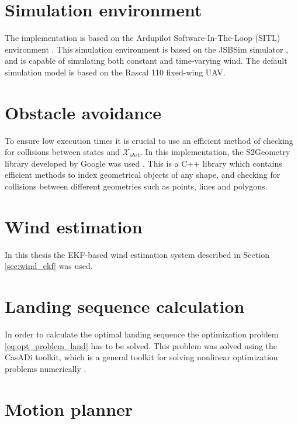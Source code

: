 \section{Simulation environment}
The implementation is based on the Ardupilot Software-In-The-Loop (SITL) environment \cite{ardupilot_sitl}. This simulation environment is based on the 
JSBSim simulator \cite{jsbsim}, and is capable of simulating both constant and time-varying wind. The default simulation model is based on the 
Rascal 110 fixed-wing UAV.
\section{Obstacle avoidance}
To ensure low execution times it is crucial to use an efficient method of checking for collisions between states and $\mathcal{X}_{obst}$. 
In this implementation, the S2Geometry library developed by Google was used \cite{s2geo}. This is a C++ library which contains 
efficient methods to index geometrical objects of any shape, and checking for collisions between different geometries such as points, lines and polygons. 
\section{Wind estimation}
In this thesis the EKF-based wind estimation system described in Section \ref{sec:wind_ekf} was used.
\section{Landing sequence calculation}
In order to calculate the optimal landing sequence the optimization problem \eqref{eq:opt_problem_land} has to be solved. 
This problem was solved using the CasADi toolkit, which is a general toolkit for solving nonlinear optimization problems numerically \cite{casadi}.
\section{Motion planner} 
